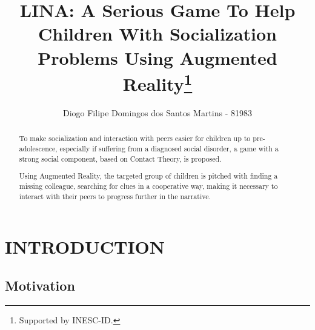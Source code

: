 \documentclass[runningheads]{llncs}
\begin{document}
\title{LINA: A Serious Game To Help Children With Socialization Problems Using Augmented Reality\thanks{Supported by INESC-ID.}}

%

\author{Diogo Filipe Domingos dos Santos Martins - 81983}
%
%

\maketitle              %

\begin{abstract}
To make socialization and interaction with peers easier for children up to pre-adolescence, especially if suffering from a diagnosed social disorder, a game with a strong social component, based on Contact Theory, is proposed. 
\par Using Augmented Reality, the targeted group of children is pitched with finding a missing colleague, searching for clues in a cooperative way, making it necessary to interact with their peers to progress further in the narrative.

\end{abstract}
%
%
%

\section{INTRODUCTION}

\subsection{Motivation}
\end{document}
